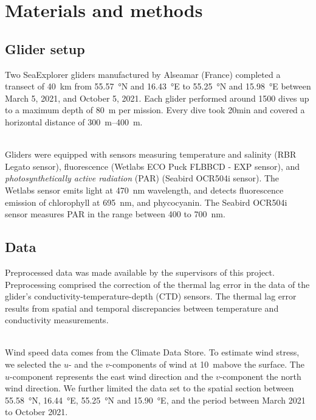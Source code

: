 \documentclass[../Main.tex]{subfiles}
\begin{document}
\section*{\crule[blue]{.3cm}{.3cm} Materials and methods}
\subsection*{\crule[blue]{.2cm}{.2cm} Glider setup}
Two SeaExplorer gliders manufactured by Alseamar (France) completed a transect of \SI{40}{km} from \SI{55.57}{\degree}N and \SI{16.43}{\degree}E to \SI{55.25}{\degree}N and \SI{15.98}{\degree}E between March 5, 2021, and October 5, 2021. 
Each glider performed around 1500 dives up to a maximum depth of \SI{80}{m} per mission. 
Every dive took 20min and covered a horizontal distance of \SIrange{300}{400}{m}. 

\\ 
Gliders were equipped with sensors measuring temperature and salinity (RBR Legato sensor), fluorescence (Wetlabs ECO Puck FLBBCD - EXP sensor), and \emph{photosynthetically active radiation} (PAR) (Seabird OCR504i sensor). 
The Wetlabs sensor emits light at \SI{470}{nm} wavelength, and detects fluorescence emission of chlorophyll at \SI{695}{nm}, and phycocyanin. 
The Seabird OCR504i sensor measures PAR in the range between 400 to \SI{700}{nm}\supercite{ACSA2014}.

\subsection*{\crule[blue]{.2cm}{.2cm} Data}
Preprocessed data was made available by the supervisors of this project. Preprocessing comprised the correction of the thermal lag error in the data of the glider's conductivity-temperature-depth (CTD) sensors.
The thermal lag error results from spatial and temporal discrepancies between temperature and conductivity measurements\supercite{Garau2011}.

\\
Wind speed data comes from the Climate Data Store\supercite{era}. 
To estimate wind stress, we selected the $u$- and the $v$-components of wind at \SI{10}{m}above the surface. 
The $u$-component represents the east wind direction and the $v$-component the north wind direction\supercite{era2}. 
We further limited the data set to the spatial section between \SI{55.58}{\degree}N, \SI{16.44}{\degree}E, \SI{55.25}{\degree}N and \SI{15.90}{\degree}E, and the period between March 2021 to October 2021. 
\end{document}
